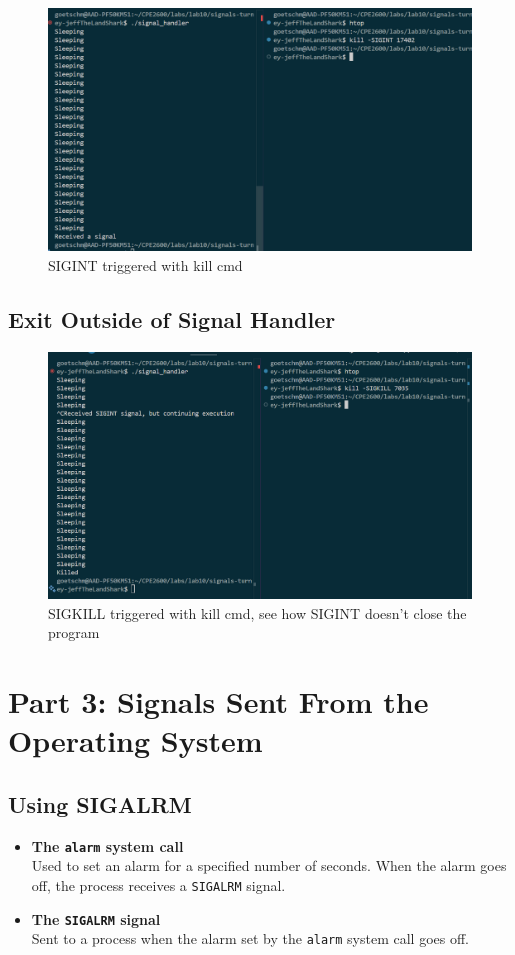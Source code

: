 \documentclass{assignment}
\begin{document}
\begin{figure}
    \centering
    \includegraphics[width=1\linewidth]{images/SIGINT_kill.png}
    \caption{SIGINT triggered with kill cmd}
\end{figure}

\subsection{Exit Outside of Signal Handler}

\begin{figure}
    \centering
    \includegraphics[width=1\linewidth]{images/SIGKILL.png}
    \caption{SIGKILL triggered with kill cmd, see how SIGINT doesn't close the program}
\end{figure}

\section{Part 3: Signals Sent From the Operating System}

\subsection{Using SIGALRM}
\begin{itemize}
    \item \textbf{The \verb|alarm| system call}\\
    Used to set an alarm for a specified number of seconds. When the alarm goes off, the process receives a \verb|SIGALRM| signal.
    \item \textbf{The \verb|SIGALRM| signal}\\
    Sent to a process when the alarm set by the \verb|alarm| system call goes off.
\end{itemize}
\end{document}
